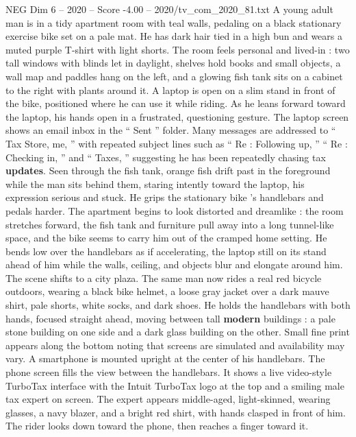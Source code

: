 \begin{textsample}{NEG Dim 6 – 2020 – Score -4.00 – 2020/tv\_com\_2020\_81.txt}  \label{ex:f6_neg_031}
A young adult man is in a tidy apartment room with teal walls, pedaling on a black stationary exercise bike set on a pale mat.
He has dark hair tied in a high bun and wears a muted purple T-shirt with light shorts.
The room feels personal and lived-in : two tall windows with blinds let in daylight, shelves hold books and small objects, a wall map and paddles hang on the left, and a glowing fish tank sits on a cabinet to the right with plants around it.
A laptop is open on a slim stand in front of the bike, positioned where he can use it while riding.
As he leans forward toward the laptop, his hands open in a frustrated, questioning gesture.
The laptop screen shows an email inbox in the “ Sent ” folder.
Many messages are addressed to “ Tax Store, me, ” with repeated subject lines such as “ Re : Following up, ” “ Re : Checking in, ” and “ Taxes, ” suggesting he has been repeatedly chasing tax \textbf{updates}.
Seen through the fish tank, orange fish drift past in the foreground while the man sits behind them, staring intently toward the laptop, his expression serious and stuck.
He grips the stationary bike ’s handlebars and pedals harder.
The apartment begins to look distorted and dreamlike : the room stretches forward, the fish tank and furniture pull away into a long tunnel-like space, and the bike seems to carry him out of the cramped home setting.
He bends low over the handlebars as if accelerating, the laptop still on its stand ahead of him while the walls, ceiling, and objects blur and elongate around him.
The scene shifts to a city plaza.
The same man now rides a real red bicycle outdoors, wearing a black bike helmet, a loose gray jacket over a dark mauve shirt, pale shorts, white socks, and dark shoes.
He holds the handlebars with both hands, focused straight ahead, moving between tall \textbf{modern} buildings : a pale stone building on one side and a dark glass building on the other.
Small fine print appears along the bottom noting that screens are simulated and availability may vary.
A smartphone is mounted upright at the center of his handlebars.
The phone screen fills the view between the handlebars.
It shows a live video-style TurboTax interface with the Intuit TurboTax logo at the top and a smiling male tax expert on screen.
The expert appears middle-aged, light-skinned, wearing glasses, a navy blazer, and a bright red shirt, with hands clasped in front of him.
The rider looks down toward the phone, then reaches a finger toward it.

\end{textsample}
